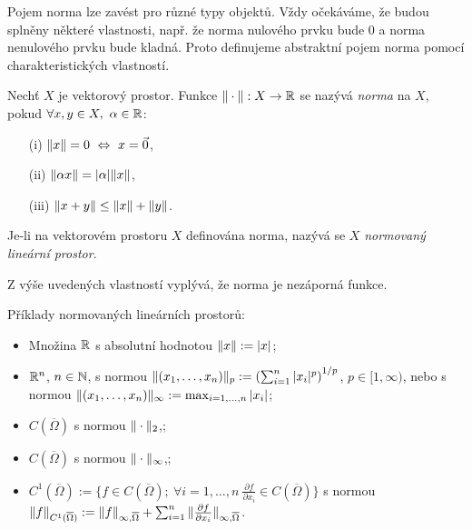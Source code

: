 Pojem norma lze zavést pro různé typy objektů.
Vždy očekáváme, že budou splněny některé vlastnosti, např. že norma nulového prvku bude 0 a norma nenulového prvku bude kladná.
Proto definujeme abstraktní pojem norma pomocí charakteristických vlastností.
\begin{df}
Nechť $X$ je vektorový prostor. Funkce $\|\cdot\|:X\rightarrow\mathbb R$ se nazývá \emph{norma} na $X$, pokud $\forall x,y\in X,~\alpha\in\mathbb R$:
\begin{itemize}
\item[(i)] $\|x\|=0 ~\Leftrightarrow~x=\vec 0$,
\item[(ii)] $\|\alpha x\|=|\alpha|\|x\|$,
\item[(iii)] $\|x+y\|\le\|x\|+\|y\|$.
\end{itemize}
Je-li na vektorovém prostoru $X$ definována norma, nazývá se $X$ \emph{normovaný lineární prostor}.
\end{df}
Z výše uvedených vlastností vyplývá, že norma je nezáporná funkce.

\begin{ex}
Příklady normovaných lineárních prostorů:
\begin{itemize}
\item Množina $\mathbb R$ s absolutní hodnotou $\|x\|:=|x|$;
\item $\mathbb R^n$, $n\in\mathbb N$, s normou $\|(x_1,\ldots,x_n)\|_p:=\left(\sum_{i=1}^n|x_i|^p\right)^{1/p}$, $p\in[1,\infty)$, nebo s normou $\|(x_1,\ldots,x_n)\|_\infty:=\max_{i=1,\ldots,n}|x_i|$;
\item $C(\overline\Omega)$ s normou $\|\cdot\|_2$,;
\item $C(\overline\Omega)$ s normou $\|\cdot\|_\infty$,;
\item $C^1(\overline\Omega):=\{f\in C(\overline\Omega);~\forall i=1,\ldots,n~\frac{\partial f}{\partial x_i}\in C(\overline\Omega)\}$ s normou $\|f\|_{C^1(\overline\Omega)} := \|f\|_{\infty,\overline\Omega} + \sum_{i=1}^n\|\frac{\partial f}{\partial x_i}\|_{\infty,\overline\Omega}$.
\end{itemize}
\end{ex}

